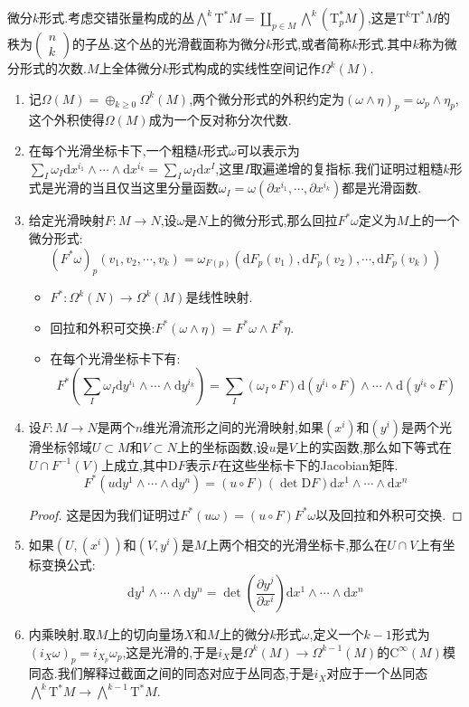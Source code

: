 微分$k$形式.考虑交错张量构成的丛$\bigwedge^k\mathrm{T}^*M=\coprod_{p\in M}\bigwedge^k(\mathrm{T}_p^*M)$,这是$\mathrm{T}^k\mathrm{T}^*M$的秩为$\left(\begin{array}{c}n\\k\end{array}\right)$的子丛.这个丛的光滑截面称为微分$k$形式,或者简称$k$形式.其中$k$称为微分形式的次数.$M$上全体微分$k$形式构成的实线性空间记作$\Omega^k(M)$.
\begin{enumerate}
	\item 记$\Omega(M)=\oplus_{k\ge0}\Omega^k(M)$,两个微分形式的外积约定为$(\omega\wedge\eta)_p=\omega_p\wedge\eta_p$,这个外积使得$\Omega(M)$成为一个反对称分次代数.
	\item 在每个光滑坐标卡下,一个粗糙$k$形式$\omega$可以表示为$\sum_I\omega_I\mathrm{d}x^{i_1}\wedge\cdots\wedge\mathrm{d}x^{i_k}=\sum_I\omega_I\mathrm{d}x^I$,这里$I$取遍递增的复指标.我们证明过粗糙$k$形式是光滑的当且仅当这里分量函数$\omega_I=\omega(\partial x^{i_1},\cdots,\partial x^{i_k})$都是光滑函数.
	\item 给定光滑映射$F:M\to N$,设$\omega$是$N$上的微分形式,那么回拉$F^*\omega$定义为$M$上的一个微分形式:$$(F^*\omega)_p(v_1,v_2,\cdots,v_k)=\omega_{F(p)}(\mathrm{d}F_p(v_1),\mathrm{d}F_p(v_2),\cdots,\mathrm{d}F_p(v_k))$$
	\begin{itemize}
		\item $F^*:\Omega^k(N)\to\Omega^k(M)$是线性映射.
		\item 回拉和外积可交换:$F^*(\omega\wedge\eta)=F^*\omega\wedge F^*\eta$.
		\item 在每个光滑坐标卡下有:
		$$F^*\left(\sum_I\omega_I\mathrm{d}y^{i_1}\wedge\cdots\wedge\mathrm{d}y^{i_k}\right)=\sum_I(\omega_I\circ F)\mathrm{d}(y^{i_1}\circ F)\wedge\cdots\wedge\mathrm{d}(y^{i_k}\circ F)$$
	\end{itemize}
    \item 设$F:M\to N$是两个$n$维光滑流形之间的光滑映射,如果$(x^i)$和$(y^i)$是两个光滑坐标邻域$U\subset M$和$V\subset N$上的坐标函数,设$u$是$V$上的实函数,那么如下等式在$U\cap F^{-1}(V)$上成立,其中$\mathrm{D}F$表示$F$在这些坐标卡下的Jacobian矩阵.
    $$F^*(u\mathrm{d}y^1\wedge\cdots\wedge\mathrm{d}y^n)=(u\circ F)(\det\mathrm{D}F)\mathrm{d}x^1\wedge\cdots\wedge\mathrm{d}x^n$$
    \begin{proof}
    	
    	这是因为我们证明过$F^*(u\omega)=(u\circ F)F^*\omega$以及回拉和外积可交换.
    \end{proof}
    \item 如果$(U,(x^i))$和$(V,y^i)$是$M$上两个相交的光滑坐标卡,那么在$U\cap V$上有坐标变换公式:
    $$\mathrm{d}y^1\wedge\cdots\wedge\mathrm{d}y^n=\det\left(\frac{\partial y^j}{\partial x^i}\right)\mathrm{d}x^1\wedge\cdots\wedge\mathrm{d}x^n$$
    \item 内乘映射.取$M$上的切向量场$X$和$M$上的微分$k$形式$\omega$,定义一个$k-1$形式为$(i_X\omega)_p=i_{X_p}\omega_p$,这是光滑的,于是$i_X$是$\Omega^k(M)\to\Omega^{k-1}(M)$的$\mathrm{C}^{\infty}(M)$模同态.我们解释过截面之间的同态对应于丛同态,于是$i_X$对应于一个丛同态$\bigwedge^k\mathrm{T}^*M\to\bigwedge^{k-1}\mathrm{T}^*M$.
\end{enumerate}

